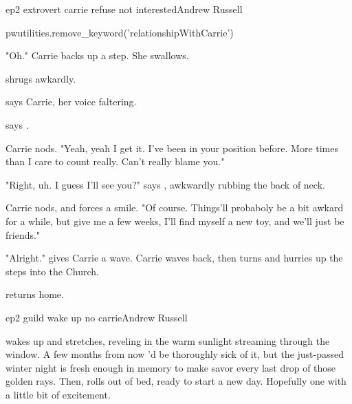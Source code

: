\documentclass{book}
\begin{document}
\begin{childnode}{ep2 extrovert carrie refuse not interested}{Andrew Russell}


    \begin{code}

        pwutilities.remove_keyword('relationshipWithCarrie')

    \end{code}

    "Oh." Carrie backs up a step. She swallows.
    
    \name{} shrugs awkardly.

     says Carrie, her voice faltering.

     says \name{}.

    Carrie nods. "Yeah, yeah I get it. I've been in your position before. More times than I care to count really. Can't really blame you."

    "Right, uh. I guess I'll see you?" says \name{}, awkwardly rubbing the back of \names{} neck.

    Carrie nods, and forces a smile. "Of course. Things'll probaboly be a bit awkard for a while, but give me a few weeks, I'll find myself a new toy, and we'll just be friends."

    "Alright." \name{} gives Carrie a wave. Carrie waves back, then turns and hurries up the steps into the Church.

    \name{} returns home.



\end{childnode}

\begin{childnode}{ep2 guild wake up no carrie}{Andrew Russell}

    \name{} wakes up and stretches, reveling in the warm sunlight streaming through the window. A few months from now \heshe{}'d be thoroughly sick of it, but the just-passed winter night is fresh enough in \hisher{} memory to make \himher{} savor every last drop
    of those golden rays.
    Then, \heshe{} rolls out of bed, ready to start a new day. Hopefully one with a little bit of excitement.

\end{childnode}
\end{document}
